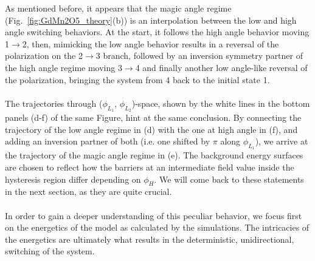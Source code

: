 As mentioned before, it appears that the magic angle regime (Fig.~\ref{fig:GdMn2O5_theory}(b)) is an interpolation between the low and high angle switching behaviors.
At the start, it follows the high angle behavior moving 1$\rightarrow$2, then, mimicking the low angle behavior results in a reversal of the polarization on the 2$\rightarrow$3 branch, followed by an inversion symmetry partner of the high angle regime moving 3$\rightarrow$4 and finally another low angle-like reversal of the polarization, bringing the system from 4 back to the initial state 1. 
\\\\
The trajectories through ($\phi_{L_1}$, $\phi_{L_2}$)-space, shown by the white lines in the bottom panels (d-f) of the same Figure, hint at the same conclusion.
By connecting the trajectory of the low angle regime in (d) with the one at high angle in (f), and adding an inversion partner of both (i.e. one shifted by $\pi$ along $\phi_{L_1}$), we arrive at the trajectory of the magic angle regime in (e).
The background energy surfaces are chosen to reflect how the barriers at an intermediate field value inside the hysteresis region differ depending on $\phi_H$.
We will come back to these statements in the next section, as they are quite crucial.
\\\\
In order to gain a deeper understanding of this peculiar behavior, we focus first on the energetics of the model as calculated by the simulations.
The intricacies of the energetics are ultimately what results in the deterministic, unidirectional, switching of the system.

